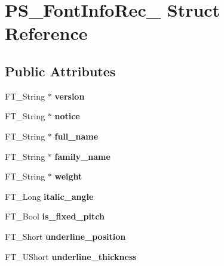 \hypertarget{struct_p_s___font_info_rec__}{}\section{P\+S\+\_\+\+Font\+Info\+Rec\+\_\+ Struct Reference}
\label{struct_p_s___font_info_rec__}
\subsection*{Public Attributes}
\begin{DoxyCompactItemize}
\item 
F\+T\+\_\+\+String $\ast$ {\bfseries version}\hypertarget{struct_p_s___font_info_rec___adb595076e50f8e7ece9446f612433cfc}{}\label{struct_p_s___font_info_rec___adb595076e50f8e7ece9446f612433cfc}

\item 
F\+T\+\_\+\+String $\ast$ {\bfseries notice}\hypertarget{struct_p_s___font_info_rec___a63858ebce653f21d9aa2ddc61ee32b80}{}\label{struct_p_s___font_info_rec___a63858ebce653f21d9aa2ddc61ee32b80}

\item 
F\+T\+\_\+\+String $\ast$ {\bfseries full\+\_\+name}\hypertarget{struct_p_s___font_info_rec___a039dbf76ccc1b63b03e77215cb4b430b}{}\label{struct_p_s___font_info_rec___a039dbf76ccc1b63b03e77215cb4b430b}

\item 
F\+T\+\_\+\+String $\ast$ {\bfseries family\+\_\+name}\hypertarget{struct_p_s___font_info_rec___ac54d883f153a495f9a20dc043ed434cf}{}\label{struct_p_s___font_info_rec___ac54d883f153a495f9a20dc043ed434cf}

\item 
F\+T\+\_\+\+String $\ast$ {\bfseries weight}\hypertarget{struct_p_s___font_info_rec___a057243ec7cf62f573fa675ccb728f4b1}{}\label{struct_p_s___font_info_rec___a057243ec7cf62f573fa675ccb728f4b1}

\item 
F\+T\+\_\+\+Long {\bfseries italic\+\_\+angle}\hypertarget{struct_p_s___font_info_rec___ab558a75a56fadd54dfc71dcbeec1375a}{}\label{struct_p_s___font_info_rec___ab558a75a56fadd54dfc71dcbeec1375a}

\item 
F\+T\+\_\+\+Bool {\bfseries is\+\_\+fixed\+\_\+pitch}\hypertarget{struct_p_s___font_info_rec___a68e2d0913fe910ea86d558a4a426412a}{}\label{struct_p_s___font_info_rec___a68e2d0913fe910ea86d558a4a426412a}

\item 
F\+T\+\_\+\+Short {\bfseries underline\+\_\+position}\hypertarget{struct_p_s___font_info_rec___a772af52d17288d7846e8893e74d55212}{}\label{struct_p_s___font_info_rec___a772af52d17288d7846e8893e74d55212}

\item 
F\+T\+\_\+\+U\+Short {\bfseries underline\+\_\+thickness}\hypertarget{struct_p_s___font_info_rec___a423904e811db5195485557bf0dccf126}{}\label{struct_p_s___font_info_rec___a423904e811db5195485557bf0dccf126}

\end{DoxyCompactItemize}


